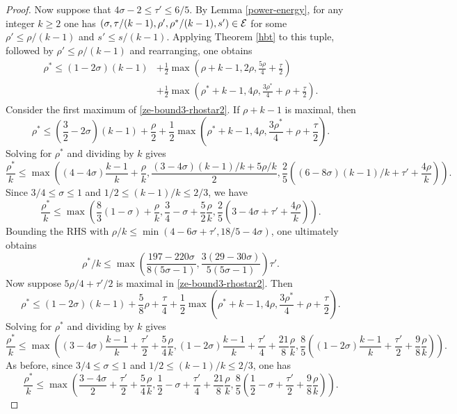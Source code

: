 \begin{proof}
Now suppose that $4\sigma - 2 \le \tau' \le 6/5$. By Lemma \ref{power-energy}, for any integer $k \ge 2$ one has $(\sigma, \tau/(k - 1), \rho', \rho^*/(k - 1), s') \in \mathcal{E}$ for some $\rho' \le \rho/(k - 1)$ and $s' \le s/(k - 1)$. Applying Theorem \ref{hbt} to this tuple, followed by $\rho' \le \rho/(k - 1)$ and rearranging, one obtains
\begin{equation}\label{ze-bound3-rhostar2}
\begin{split}
\rho^* \le (1-2\sigma)(k - 1) &+ \frac{1}{2}\max(\rho+k - 1, 2\rho, \frac{5\rho}{4} + \frac{\tau}{2}) \\
&+ \frac{1}{2}\max(\rho^*+k - 1, 4\rho, \frac{3\rho^*}{4} + \rho+\frac{\tau}{2}).
\end{split}
\end{equation}
Consider the first maximum of \eqref{ze-bound3-rhostar2}. If $\rho + k - 1$ is maximal, then
\[
\rho^* \le (\frac{3}{2} - 2\sigma)(k - 1) + \frac{\rho}{2} + \frac{1}{2}\max(\rho^*+k - 1, 4\rho, \frac{3\rho^*}{4} + \rho+\frac{\tau}{2}).
\]
Solving for $\rho^*$ and dividing by $k$ gives
\[
\frac{\rho^*}{k} \le \max((4 - 4\sigma)\frac{k - 1}{k} + \frac{\rho}{k}, \frac{(3 - 4\sigma)(k - 1)/k + 5\rho/k}{2}, \frac{2}{5}((6 - 8\sigma)(k - 1)/k + \tau' + \frac{4\rho}{k})).
\]
Since $3/4 \le \sigma \le 1$ and $1/2 \le (k - 1)/k \le 2/3$, we have
\[
\frac{\rho^*}{k} \le \max\left(\frac{8}{3}(1 - \sigma) + \frac{\rho}{k}, \frac{3}{4} - \sigma + \frac{5}{2}\frac{\rho}{k}, \frac{2}{5}(3 - 4\sigma + \tau' + \frac{4\rho}{k})\right).
\]
Bounding the RHS with $\rho/k \le \min(4 - 6\sigma + \tau', 18/5 - 4\sigma)$, one ultimately obtains
\[
\rho^*/k \le \max\left(\frac{197 - 220\sigma}{8(5\sigma - 1)}, \frac{3(29 - 30\sigma)}{5(5\sigma - 1)}\right)\tau'.
\]
Now suppose $5\rho/4 + \tau'/2$ is maximal in \eqref{ze-bound3-rhostar2}. Then
\[
\rho^* \le (1 - 2\sigma)(k - 1) + \frac{5}{8}\rho + \frac{\tau}{4} + \frac{1}{2}\max(\rho^*+k - 1, 4\rho, \frac{3\rho^*}{4} + \rho+\frac{\tau}{2}).
\]
Solving for $\rho^*$ and dividing by $k$ gives
\[
\frac{\rho^*}{k} \le \max((3 - 4\sigma)\frac{k - 1}{k} + \frac{\tau'}{2} + \frac{5}{4}\frac{\rho}{k}, (1 - 2\sigma)\frac{k - 1}{k} + \frac{\tau'}{4} + \frac{21}{8}\frac{\rho}{k}, \frac{8}{5}((1 - 2\sigma)\frac{k - 1}{k} + \frac{\tau'}{2} + \frac{9}{8}\frac{\rho}{k})).
\]
As before, since $3/4 \le \sigma \le 1$ and $1/2 \le (k - 1)/k \le 2/3$, one has
\[
\frac{\rho^*}{k} \le \max(\frac{3 - 4\sigma}{2} + \frac{\tau'}{2} + \frac{5}{4}\frac{\rho}{k}, \frac{1}{2} - \sigma + \frac{\tau'}{4} + \frac{21}{8}\frac{\rho}{k}, \frac{8}{5}(\frac{1}{2} - \sigma + \frac{\tau'}{2} + \frac{9}{8}\frac{\rho}{k})).
\]
\end{proof}
